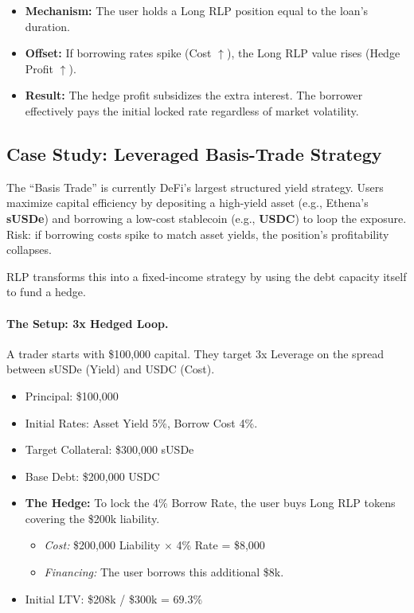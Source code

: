 \documentclass[12pt]{article}
\begin{document}
\begin{itemize}
    \item \textbf{Mechanism:} The user holds a Long RLP position equal to the loan's duration.
    \item \textbf{Offset:} If borrowing rates spike (Cost $\uparrow$), the Long RLP value rises (Hedge Profit $\uparrow$).
    \item \textbf{Result:} The hedge profit subsidizes the extra interest. The borrower effectively pays the initial locked rate regardless of market volatility.
\end{itemize}

\subsection{Case Study: Leveraged Basis-Trade Strategy}

The ``Basis Trade'' is currently DeFi's largest structured yield strategy. Users maximize capital efficiency by depositing a high-yield asset (e.g., Ethena's \textbf{sUSDe}) and borrowing a low-cost stablecoin (e.g., \textbf{USDC}) to loop the exposure. Risk: if borrowing costs spike to match asset yields, the position's profitability collapses.

RLP transforms this into a fixed-income strategy by using the debt capacity itself to fund a hedge.

\paragraph{The Setup: 3x Hedged Loop.}
A trader starts with \$100,000 capital. They target 3x Leverage on the spread between sUSDe (Yield) and USDC (Cost).

\begin{itemize}
    \item Principal: \$100,000
    \item Initial Rates: Asset Yield 5\%, Borrow Cost 4\%.
    \item Target Collateral: \$300,000 sUSDe
    \item Base Debt: \$200,000 USDC
    \item \textbf{The Hedge:} To lock the 4\% Borrow Rate, the user buys Long RLP tokens covering the \$200k liability.
    \begin{itemize}
        \item \emph{Cost:} \$200,000 Liability $\times$ 4\% Rate = \$8,000
        \item \emph{Financing:} The user borrows this additional \$8k.
    \end{itemize}
    \item Initial LTV: \$208k / \$300k = $\mathbf{69.3\%}$
\end{itemize}
\end{document}

